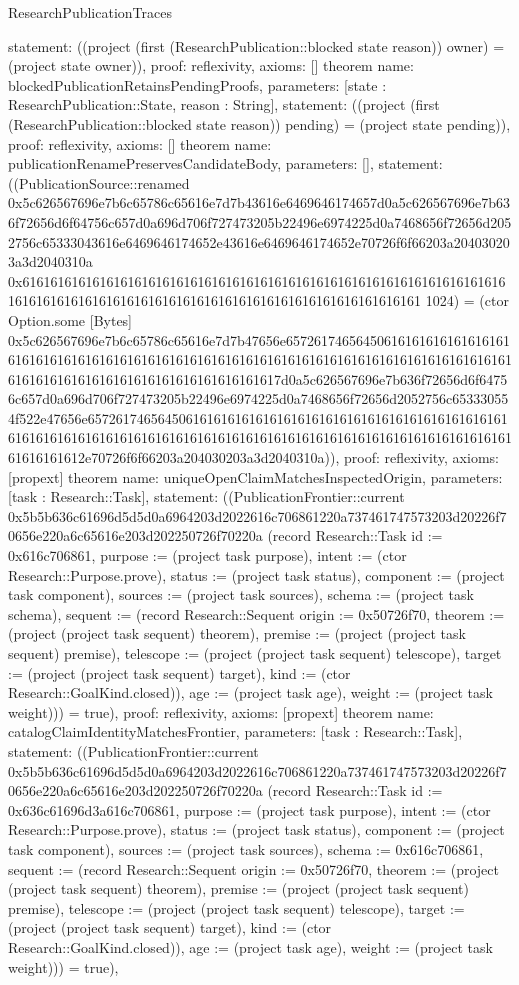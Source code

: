 \begin{lexlean}{ResearchPublicationTraces}
\begin{semanticmodule}
{ statement: ((project (first (ResearchPublication::blocked state reason)) owner) = (project state owner)),
 proof: reflexivity{},
 axioms: []
}
theorem{
 name: blockedPublicationRetainsPendingProofs,
 parameters: [state : ResearchPublication::State, reason : String],
 statement: ((project (first (ResearchPublication::blocked state reason)) pending) = (project state pending)),
 proof: reflexivity{},
 axioms: []
}
theorem{
 name: publicationRenamePreservesCandidateBody,
 parameters: [],
 statement: ((PublicationSource::renamed 0x5c626567696e7b6c65786c65616e7d7b43616e6469646174657d0a5c626567696e7b636f72656d6f64756c657d0a696d706f727473205b22496e6974225d0a7468656f72656d2052756c65333043616e6469646174652e43616e6469646174652e70726f6f66203a204030203a3d2040310a 0x61616161616161616161616161616161616161616161616161616161616161616161616161616161616161616161616161616161616161616161616161616161 1024) = (ctor Option.some [Bytes] 0x5c626567696e7b6c65786c65616e7d7b47656e65726174656450616161616161616161616161616161616161616161616161616161616161616161616161616161616161616161616161616161616161616161616161616161617d0a5c626567696e7b636f72656d6f64756c657d0a696d706f727473205b22496e6974225d0a7468656f72656d2052756c653330554f522e47656e65726174656450616161616161616161616161616161616161616161616161616161616161616161616161616161616161616161616161616161616161616161616161616161612e70726f6f66203a204030203a3d2040310a)),
 proof: reflexivity{},
 axioms: [propext]
}
theorem{
 name: uniqueOpenClaimMatchesInspectedOrigin,
 parameters: [task : Research::Task],
 statement: ((PublicationFrontier::current 0x5b5b636c61696d5d5d0a6964203d2022616c706861220a737461747573203d20226f70656e220a6c65616e203d202250726f70220a (record Research::Task {id := 0x616c706861, purpose := (project task purpose), intent := (ctor Research::Purpose.prove), status := (project task status), component := (project task component), sources := (project task sources), schema := (project task schema), sequent := (record Research::Sequent {origin := 0x50726f70, theorem := (project (project task sequent) theorem), premise := (project (project task sequent) premise), telescope := (project (project task sequent) telescope), target := (project (project task sequent) target), kind := (ctor Research::GoalKind.closed)}), age := (project task age), weight := (project task weight)})) = true),
 proof: reflexivity{},
 axioms: [propext]
}
theorem{
 name: catalogClaimIdentityMatchesFrontier,
 parameters: [task : Research::Task],
 statement: ((PublicationFrontier::current 0x5b5b636c61696d5d5d0a6964203d2022616c706861220a737461747573203d20226f70656e220a6c65616e203d202250726f70220a (record Research::Task {id := 0x636c61696d3a616c706861, purpose := (project task purpose), intent := (ctor Research::Purpose.prove), status := (project task status), component := (project task component), sources := (project task sources), schema := 0x616c706861, sequent := (record Research::Sequent {origin := 0x50726f70, theorem := (project (project task sequent) theorem), premise := (project (project task sequent) premise), telescope := (project (project task sequent) telescope), target := (project (project task sequent) target), kind := (ctor Research::GoalKind.closed)}), age := (project task age), weight := (project task weight)})) = true),
}
\end{semanticmodule}
\end{lexlean}
